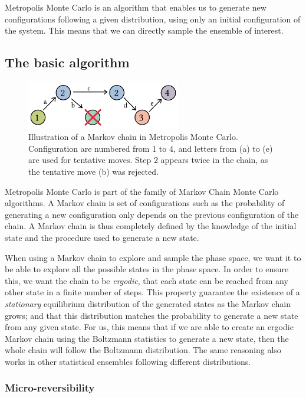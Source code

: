 \documentclass[thesis]{subfiles}
\begin{document}
Metropolis Monte Carlo is an algorithm that enables us to generate new
configurations following a given distribution, using only an initial
configuration of the system. This means that we can directly sample the ensemble
of interest.

\subsection{The basic algorithm}

\begin{figure}[ht]
    \centering
    \includegraphics[width=0.6\textwidth]{figures/images/mc-chain}
    \caption{Illustration of a Markov chain in Metropolis Monte Carlo.
    Configuration are numbered from 1 to 4, and letters from (a) to (e) are used
    for tentative moves. Step 2 appears twice in the chain, as the tentative
    move (b) was rejected.}
    \label{fig:mc:chain}
\end{figure}

Metropolis Monte Carlo is part of the family of Markov Chain Monte Carlo
algorithms. A Markov chain is set of configurations such as the probability of
generating a new configuration only depends on the previous configuration of the
chain. A Markov chain is thus completely defined by the knowledge of the initial
state and the procedure used to generate a new state.

When using a Markov chain to explore and sample the phase space, we want it to
be able to explore all the possible states in the phase space. In order to
ensure this, we want the chain to be \emph{ergodic}, \ie that each state can be
reached from any other state in a finite number of steps. This property
guarantee the existence of a \emph{stationary} equilibrium distribution of the
generated states as the Markov chain grows; and that this distribution matches
the probability to generate a new state from any given state. For us, this means
that if we are able to create an ergodic Markov chain using the Boltzmann
statistics to generate a new state, then the whole chain will follow the
Boltzmann distribution. The same reasoning also works in other statistical
ensembles following different distributions.

\subsubsection{Micro-reversibility}
\end{document}
